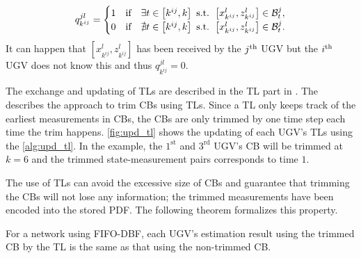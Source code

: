	\small\begin{equation}\label{eqn:tl_entry}
	q^{jl}_{k^{ij}}=
	\begin{cases}
	1 & \text{if}\quad \exists t\in\left[k^{ij}, k\right] \text{ s.t. } \left[x^l_{k^{ij}},z^l_{k^{ij}}\right]\in \mathcal{B}^j_t,\\
	0 & \text{if}\quad \nexists t\in\left[k^{ij}, k\right] \text{ s.t. } \left[x^l_{k^{ij}},z^l_{k^{ij}}\right]\in \mathcal{B}^j_t.
	\end{cases}
	\end{equation}\normalsize
	It can happen that $\left[x^l_{k^{ij}},z^l_{k^{ij}}\right]$ has been received by the $j^\text{th}$ UGV but the $i^\text{th}$ UGV does not know this and thus $q^{jl}_{k^{ij}}=0$.
	
	The exchange and updating of TLs are described in the TL part in .
	The  describes the approach to trim CBs using TLs.
	Since a TL only keeps track of the earliest measurements in CBs, the CBs are only trimmed by one time step each time the trim happens.
	\cref{fig:upd_tl} shows the updating of each UGV's TLs using the \cref{alg:upd_tl}.
	In the example, the $1^\text{st}$ and $3^\text{rd}$ UGV's CB will be trimmed at $k=6$ and the trimmed state-measurement pairs corresponds to time $1$.
	
	The use of TLs can avoid the excessive size of CBs and guarantee that trimming the CBs will not lose any information; the trimmed measurements have been encoded into the stored PDF.
	The following theorem formalizes this property.
	
	\begin{thm}\label{thm:trim_no_loss}
		For a {\fc} network using FIFO-DBF, 
		each UGV's estimation result using the trimmed CB by the TL is the same as that using the non-trimmed CB.
	\end{thm}
	
